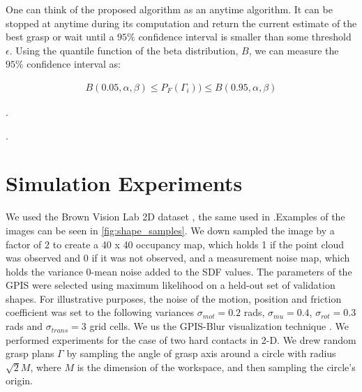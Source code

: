 \documentclass[a4paper, 10pt, conference]{ieeeconf}      %
\begin{document}
One can think of the proposed algorithm as an anytime algorithm. It can be stopped at anytime during its computation and return the current estimate of the best grasp or wait until a $95\%$ confidence interval is smaller than some threshold $\epsilon$. Using the quantile function of the beta distribution, $B$, we can measure the $95\%$ confidence interval as: 

\vspace{-2ex}
\begin{align}\label{eq:confidence}
B(0.05,\alpha,\beta) \leq P_F(\Gamma_i)) \leq B(0.95,\alpha,\beta)
\end{align}

\vspace{-2ex}
. 

 .
\section{Simulation Experiments}
We used the Brown Vision Lab 2D dataset \cite{brown}, the same used in \cite{christopoulos2007handling}.Examples of the images can be seen in \ref{fig:shape_samples}.  We down sampled the image by a factor of 2 to create a 40 x 40 occupancy map, which holds 1 if the point cloud was observed and 0 if it was not observed, and a measurement noise map, which holds the variance 0-mean noise added to the SDF values. The parameters of the GPIS were selected using maximum likelihood on a held-out set of validation shapes. For illustrative purposes, the noise of the motion, position and friction coefficient was set to the following variances $\sigma_{mot} = 0.2$ rads, $\sigma_{mu} = 0.4$, $\sigma_{rot} = 0.3$ rads and $\sigma_{trans} = 3$ grid cells.
We us the GPIS-Blur visualization technique \cite{mahler2015gp}.
We performed experiments for the case of two hard contacts in 2-D. We drew random grasp plans $\Gamma$ by sampling the angle of grasp axis around a circle with radius $\sqrt{2} M$, where $M$ is the dimension of the workspace, and then sampling the circle's origin. 
\end{document}
